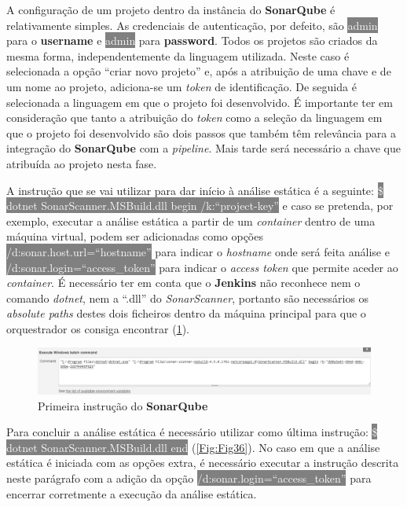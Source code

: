 \hspace{1cm}A configuração de um projeto dentro da instância do \textbf{SonarQube} é relativamente simples. As credenciais de autenticação, por defeito, são \colorbox{gray}{\textcolor{white}{admin}} para o \textbf{username} e \colorbox{gray}{\textcolor{white}{admin}} para \textbf{password}. Todos os projetos são criados da mesma forma, independentemente da linguagem utilizada. Neste caso é selecionada a opção ``criar novo projeto'' e, após a atribuição de uma chave e de um nome ao projeto, adiciona-se um \textit{token} de identificação. De seguida é selecionada a linguagem em que o projeto foi desenvolvido. É importante ter em consideração que tanto a atribuição do \textit{token} como a seleção da linguagem em que o projeto foi desenvolvido são dois passos que também têm relevância para a integração do \textbf{SonarQube} com a \textit{pipeline}. Mais tarde será necessário a chave que atribuída ao projeto nesta fase. 

\hspace{1cm}A instrução que se vai utilizar para dar início à análise estática é a seguinte: \colorbox{gray}{\textcolor{white}{\$ dotnet SonarScanner.MSBuild.dll begin /k:``project-key''}} e caso se pretenda, por exemplo, executar a análise estática a partir de um \textit{container} dentro de uma máquina virtual, podem ser adicionadas como opções \colorbox{gray}{\textcolor{white}{/d:sonar.host.url=``hostname''}} para indicar o \textit{hostname} onde será feita análise e \colorbox{gray}{\textcolor{white}{/d:sonar.login=``access\_token''}} para indicar o \textit{access token} que permite aceder ao \textit{container}. É necessário ter em conta que o \textbf{Jenkins} não reconhece nem o comando \textit{dotnet}, nem a ``.dll'' do \textit{SonarScanner}, portanto são necessários os \textit{absolute paths} destes dois ficheiros dentro da máquina principal para que o orquestrador os consiga encontrar (\ref{Fig:Fig35}).

\begin{figure}[hbt!]
\centering
\includegraphics[width=0.9\linewidth]{Cap5/JenkinsSonarQubeStart.png}
\caption{Primeira instrução do \textbf{SonarQube}}
\label{Fig:Fig35}
\end{figure}

\hspace{1cm}Para concluir a análise estática é necessário utilizar como última instrução: \colorbox{gray}{\textcolor{white}{\$ dotnet SonarScanner.MSBuild.dll end}} (\ref{Fig:Fig36}). No caso em que a análise estática é iniciada com as opções extra, é necessário executar a instrução descrita neste parágrafo com a adição da opção \colorbox{gray}{\textcolor{white}{/d:sonar.login=``access\_token''}} para encerrar corretmente a execução da análise estática.


